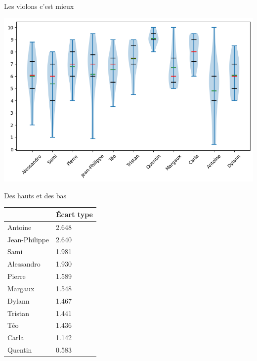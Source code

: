 \documentclass[svgnames]{beamer}
\begin{document}
\begin{frame}{Les violons c'est mieux}

\includegraphics[width=\textwidth]{data/violin_plot.png}
    
\end{frame}

\begin{frame}{Des hauts et des bas}

\begin{table}[!ht]
    \centering
    \begin{tabular}{|l|l|}
    \hline
        ~ & \textbf{Écart type} \\ \hline
        Antoine & 2.648 \\ \hline
        Jean-Philippe & 2.640 \\ \hline
        Sami & 1.981 \\ \hline
        Alessandro & 1.930 \\ \hline
        Pierre & 1.589 \\ \hline
        Margaux & 1.548 \\ \hline
        Dylann & 1.467 \\ \hline
        Tristan & 1.441 \\ \hline
        Téo & 1.436 \\ \hline
        Carla & 1.142 \\ \hline
        Quentin & 0.583 \\ \hline
    \end{tabular}
\end{table}
    
\end{frame}
\end{document}
